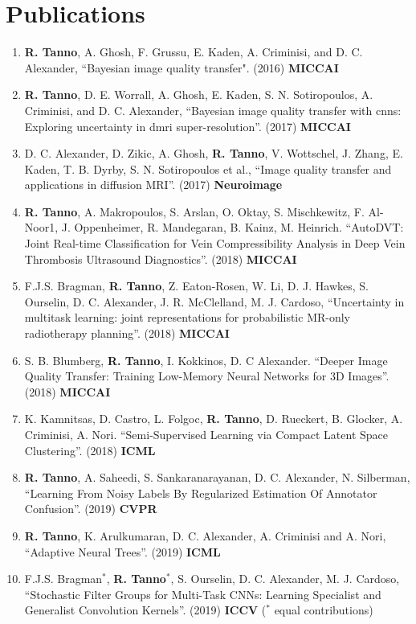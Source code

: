 \section*{Publications}
\footnotesize
\begin{enumerate}
	\item \textbf{R. Tanno}, A. Ghosh, F. Grussu, E. Kaden, A. Criminisi, and D. C. Alexander, “Bayesian image quality transfer". (2016) \textbf{MICCAI}
	
	\item \textbf{R. Tanno}, D. E. Worrall, A. Ghosh, E. Kaden, S. N. Sotiropoulos, A. Criminisi, and D. C. Alexander, “Bayesian image quality transfer with cnns: Exploring uncertainty in dmri super-resolution”. (2017) \textbf{MICCAI}
	
	\item D. C. Alexander, D. Zikic, A. Ghosh, \textbf{R. Tanno}, V. Wottschel, J. Zhang, E. Kaden, T. B. Dyrby, S. N. Sotiropoulos et al., “Image quality transfer and applications in diffusion MRI”.  (2017) \textbf{Neuroimage}
	
	\item \textbf{R. Tanno}, A. Makropoulos, S. Arslan, O. Oktay, S. Mischkewitz, F. Al-Noor1, J. Oppenheimer, R. Mandegaran, B. Kainz, M. Heinrich. ``AutoDVT: Joint Real-time Classification for Vein Compressibility Analysis in Deep Vein Thrombosis Ultrasound Diagnostics''. (2018) \textbf{MICCAI}
	
	\item F.J.S. Bragman, \textbf{R. Tanno}, Z. Eaton-Rosen, W. Li, D. J. Hawkes, S. Ourselin, D. C. Alexander, J. R. McClelland, M. J. Cardoso, ``Uncertainty in multitask learning: joint representations for probabilistic MR-only radiotherapy planning''. (2018) \textbf{MICCAI}
	
	\item S. B. Blumberg, \textbf{R. Tanno}, I. Kokkinos, D. C Alexander. ``Deeper Image Quality Transfer: Training Low-Memory Neural Networks for 3D Images''. (2018) \textbf{MICCAI }
	
	\item K. Kamnitsas, D. Castro, L. Folgoc, \textbf{R. Tanno}, D. Rueckert, B. Glocker, A. Criminisi, A. Nori. ``Semi-Supervised Learning via Compact Latent Space Clustering''. (2018) \textbf{ICML}
	
	\item \textbf{R. Tanno}, A. Saheedi, S. Sankaranarayanan, D. C. Alexander, N. Silberman, ``Learning From Noisy Labels By Regularized Estimation Of Annotator Confusion''.  (2019) \textbf{CVPR}
	\item \textbf{R. Tanno}, K. Arulkumaran, D. C. Alexander, A. Criminisi and A. Nori,  “Adaptive Neural Trees”.  (2019) \textbf{ICML }
	\item F.J.S. Bragman$^*$, \textbf{R. Tanno}$^*$, S. Ourselin, D. C. Alexander, M. J. Cardoso, ``Stochastic Filter Groups for Multi-Task CNNs: Learning Specialist and Generalist Convolution Kernels''.  (2019) \textbf{ICCV} ($^*$ equal contributions)
	

\end{enumerate}
